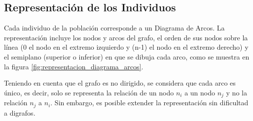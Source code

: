 	\subsection{Representación de  los Individuos}
	\label{subsec:representacion_individuos}
	Cada individuo de la población corresponde a un Diagrama de Arcos. La representación incluye  los nodos y arcos del grafo, el orden de sus nodos sobre la línea (0 el nodo en el extremo izquierdo y  (n-1) el nodo en el extremo derecho) y el semiplano   (superior o inferior) en que se dibuja cada arco, como se muestra en la figura \ref{fig:representacion_diagrama_arcos}.
	
	
	
	
	
	
	Teniendo en cuenta que  el grafo es  no dirigido, se considera que cada arco es único, es decir, solo se representa la relación de un nodo $n_i$ a un nodo $n_j$ y no la relación $n_j$ a $n_i$. Sin embargo, es posible extender la representación sin dificultad a digrafos.
	
